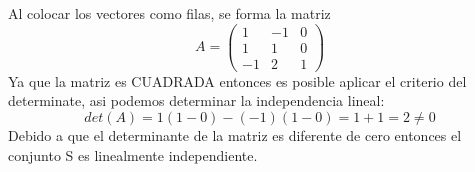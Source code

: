 Al colocar los vectores como filas, se forma la matriz
\[A=
\left(
\begin{array}{rrr}
1&-1&0\\
1&1&0\\
-1&2&1
\end{array}
\right)
\]
Ya que la matriz es CUADRADA entonces es posible aplicar el criterio del determinate, asi podemos determinar la independencia lineal:
\[det(A)=1(1-0)-(-1)(1-0)=1+1=2\neq 0\]
Debido a que el determinante de la matriz es diferente de cero entonces el conjunto S es linealmente independiente.
~\\
~\\

%
%
